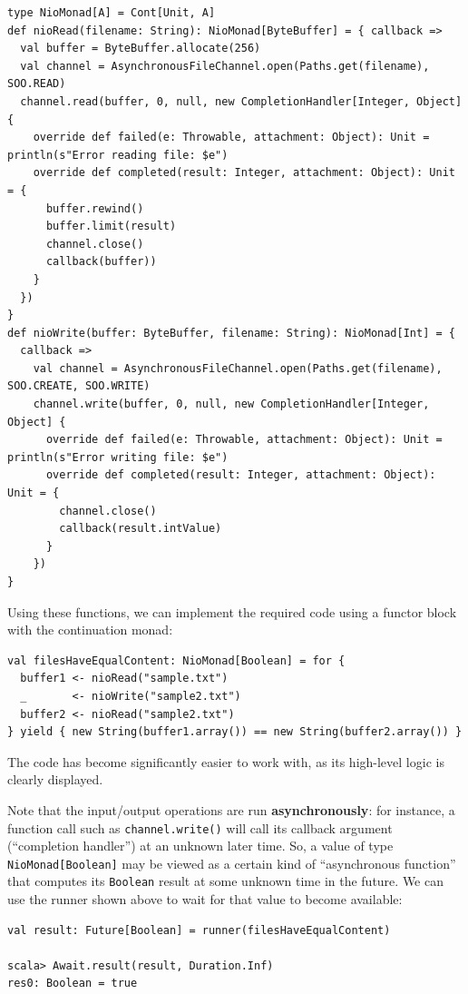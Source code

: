 \begin{lstlisting}
type NioMonad[A] = Cont[Unit, A]
def nioRead(filename: String): NioMonad[ByteBuffer] = { callback =>
  val buffer = ByteBuffer.allocate(256)
  val channel = AsynchronousFileChannel.open(Paths.get(filename), SOO.READ)
  channel.read(buffer, 0, null, new CompletionHandler[Integer, Object] {
    override def failed(e: Throwable, attachment: Object): Unit = println(s"Error reading file: $e")
    override def completed(result: Integer, attachment: Object): Unit = {
      buffer.rewind()
      buffer.limit(result)
      channel.close()
      callback(buffer))
    }
  })
}
def nioWrite(buffer: ByteBuffer, filename: String): NioMonad[Int] = {
  callback =>
    val channel = AsynchronousFileChannel.open(Paths.get(filename), SOO.CREATE, SOO.WRITE) 
    channel.write(buffer, 0, null, new CompletionHandler[Integer, Object] {
      override def failed(e: Throwable, attachment: Object): Unit = println(s"Error writing file: $e")
      override def completed(result: Integer, attachment: Object): Unit = {
        channel.close()
        callback(result.intValue)
      }
    })
}
\end{lstlisting}
Using these functions, we can implement the required code using a
functor block with the continuation monad:
\begin{lstlisting}
val filesHaveEqualContent: NioMonad[Boolean] = for {
  buffer1 <- nioRead("sample.txt")
  _       <- nioWrite("sample2.txt")
  buffer2 <- nioRead("sample2.txt")
} yield { new String(buffer1.array()) == new String(buffer2.array()) }
\end{lstlisting}
The code has become significantly easier to work with, as its high-level
logic is clearly displayed.

Note that the input/output operations are run \textbf{asynchronously}:
for instance, a function call such as \lstinline!channel.write()!
will call its callback argument (\textsf{``}completion handler\textsf{''}) at an unknown
later time. So, a value of type \lstinline!NioMonad[Boolean]! may
be viewed as a certain kind of \textsf{``}asynchronous function\textsf{''} that computes
its \lstinline!Boolean! result at some unknown time in the future.
We can use the runner shown above to wait for that value to become
available:
\begin{lstlisting}
val result: Future[Boolean] = runner(filesHaveEqualContent)

scala> Await.result(result, Duration.Inf)
res0: Boolean = true
\end{lstlisting}


